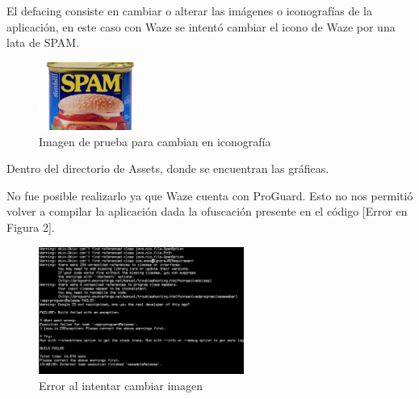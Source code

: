    El defacing consiste en cambiar o alterar las imágenes o iconografías de la aplicación, en este caso con Waze se intentó cambiar el icono de Waze por una lata de SPAM.
    \begin{figure}[H]
  \begin{center}
    \includegraphics[width=0.3\textwidth]{imagenes/fig24.png}
    \caption{Imagen de prueba para cambian en iconografía}
  \end{center}
\end{figure}

Dentro del directorio de Assets, donde se encuentran las gráficas.

No fue posible realizarlo ya que Waze cuenta con ProGuard. Esto no nos permitió volver a compilar la aplicación dada la ofuscación presente en el código [Error en Figura 2].

    \begin{figure}[H]
  \begin{center}
    \includegraphics[width=0.6\textwidth]{imagenes/fig25.png}
    \caption{Error al intentar cambiar imagen}
  \end{center}
\end{figure}